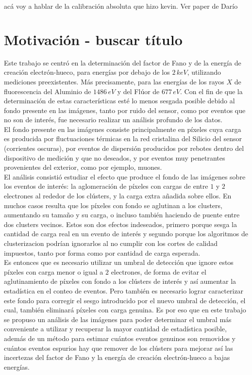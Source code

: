 acá voy a hablar de la calibración absoluta que hizo kevin. Ver paper de Darío
\section{Motivación - buscar título}
\noindent Este trabajo se centró en la determinación del factor de Fano y de la energía de creación electrón-hueco, para energías por debajo de los $2\,\si{keV}$, utilizando mediciones preexistentes. Más precisamente, para las energías de los rayos $X$ de fluorescencia del Aluminio de $1486\,\si{eV}$ y del Flúor de $677\,\si{eV}$. Con el fin de que la determinación de estas características esté lo menos sesgada posible debido al fondo presente en las imágenes, tanto por ruido del sensor, como por eventos que no son de interés, fue necesario realizar un análisis profundo de los datos.\\
\indent El fondo presente en las imágenes consiste principalmente en píxeles cuya carga es producida por fluctuaciones térmicas en la red cristalina del Silicio del sensor (corrientes oscuras), por eventos de dispersión producidos por rebotes dentro del dispositivo de medición y que no deseados, y por eventos muy penetrantes provenientes del exterior, como por ejemplo, muones.\\
\indent El análisis consistió estudiar el efecto que produce el fondo de las imágenes sobre los eventos de interés: la aglomeración de píxeles con cargas de entre $1$ y $2$ electrones al rededor de los clústers, y la carga extra añadida sobre ellos. En muchos casos resulta que los píxeles con fondo se aglutinan a los clusters, aumentando su tamaño y su carga, o incluso también haciendo de puente entre dos clusters vecinos. Estos son dos efectos indeseados, primero porque sesga la cantidad de carga real en un evento de interés y segundo porque los algoritmos de clusterizacion podrían ignorarlos al no cumplir con los cortes de calidad impuestos, tanto por forma como por cantidad de carga esperada.\\
\indent Es entonces que es necesario utilizar un umbral de detección que ignore estos píxeles con carga menor o igual a $2$ electrones, de forma de evitar el aglutinamiento de píxeles con fondo a los clústers de interés y así aumentar la estadística en el conteo de eventos. Pero también es necesario lograr caracterizar este fondo para corregir el sesgo introducido por el nuevo umbral de detección, el cual, también eliminará píxeles con carga genuina. Es por eso que en este trabajo se propuso un análisis de las imágenes para poder determinar el umbral más conveniente a utilizar y recuperar la mayor cantidad de estadística posible, además de un método para estimar cuántos eventos genuinos son removidos y cuántos eventos espurios hay que remover de los clústers para mejorar así las incertezas del factor de Fano y la energía de creación electrón-hueco a bajas energías.

